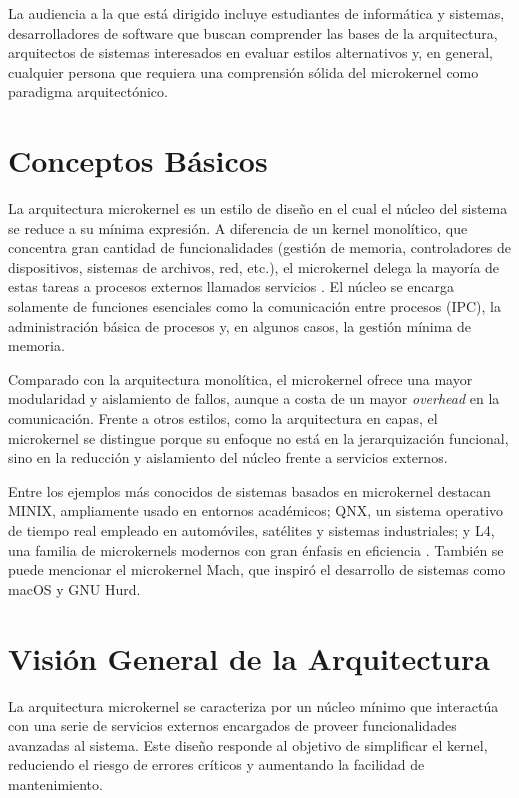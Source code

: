 \documentclass[12pt,a4paper]{article}
\begin{document}
La audiencia a la que está dirigido incluye estudiantes de informática y sistemas, desarrolladores de software que buscan comprender las bases de la arquitectura, arquitectos de sistemas interesados en evaluar estilos alternativos y, en general, cualquier persona que requiera una comprensión sólida del microkernel como paradigma arquitectónico.

\section{Conceptos Básicos}

La arquitectura microkernel es un estilo de diseño en el cual el núcleo del sistema se reduce a su mínima expresión. A diferencia de un kernel monolítico, que concentra gran cantidad de funcionalidades (gestión de memoria, controladores de dispositivos, sistemas de archivos, red, etc.), el microkernel delega la mayoría de estas tareas a procesos externos llamados servicios \cite{tanenbaum2015modern}. El núcleo se encarga solamente de funciones esenciales como la comunicación entre procesos (IPC), la administración básica de procesos y, en algunos casos, la gestión mínima de memoria.

Comparado con la arquitectura monolítica, el microkernel ofrece una mayor modularidad y aislamiento de fallos, aunque a costa de un mayor \textit{overhead} en la comunicación. Frente a otros estilos, como la arquitectura en capas, el microkernel se distingue porque su enfoque no está en la jerarquización funcional, sino en la reducción y aislamiento del núcleo frente a servicios externos.

Entre los ejemplos más conocidos de sistemas basados en microkernel destacan MINIX, ampliamente usado en entornos académicos; QNX, un sistema operativo de tiempo real empleado en automóviles, satélites y sistemas industriales; y L4, una familia de microkernels modernos con gran énfasis en eficiencia \cite{liedtke1995microkernel}. También se puede mencionar el microkernel Mach, que inspiró el desarrollo de sistemas como macOS y GNU Hurd.

\section{Visión General de la Arquitectura}

La arquitectura microkernel se caracteriza por un núcleo mínimo que interactúa con una serie de servicios externos encargados de proveer funcionalidades avanzadas al sistema. Este diseño responde al objetivo de simplificar el kernel, reduciendo el riesgo de errores críticos y aumentando la facilidad de mantenimiento.
\end{document}
